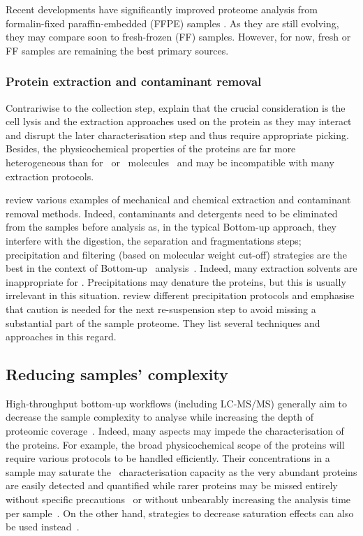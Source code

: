 Recent developments have significantly improved proteome analysis from
formalin-fixed paraffin-embedded (\gls{FFPE}) samples .
As they are still evolving,
they may compare soon to fresh-frozen (\gls{FF}) samples.
However, for now, fresh or \gls{FF} samples are remaining the best primary sources.\mybr\

\subsubsection{Protein extraction and contaminant removal}
Contrariwise to the collection step, \citet{Feist2015} explain that the crucial
consideration is the cell lysis and the extraction approaches used on
the protein as they may interact and disrupt the later characterisation step and
thus require appropriate picking. Besides, the physicochemical properties of
the proteins are far more heterogeneous than for \DNA\ or \RNA\ molecules~
and may be incompatible with many extraction protocols.\mybr\

\citet{Gutstein2008,Bodzon-Kulakowska2007,Visser2005,Hilbrig2003} review various
examples of mechanical and chemical extraction and contaminant removal methods.
Indeed, contaminants and detergents need to be eliminated from the samples
before analysis as, in the typical \gls{Bottom-up} approach, they interfere
with the digestion, the separation and fragmentations steps; precipitation and
filtering (based on molecular weight cut-off) strategies are the best in the
context of \gls{Bottom-up} \ms\ analysis~. Indeed, many
extraction solvents are inappropriate for \ms. Precipitations may denature the
proteins, but this is usually irrelevant in this situation.
\citet{Feist2015} review different precipitation protocols
and emphasise that caution is needed
for the next re-suspension step to avoid missing a substantial part of the
sample proteome. They list several techniques and approaches in this regard.\mybr\

\subsection{Reducing samples' complexity}\label{subsec:simpleProt}

High-throughput bottom-up workflows (including \gls{LC-MS/MS}) generally
aim to decrease the sample complexity to analyse while increasing the depth
of proteomic coverage~. Indeed,
many aspects may impede the characterisation of the proteins.
For example, the broad physicochemical scope of the proteins will
require various protocols to be handled efficiently.
Their concentrations in a sample may saturate the \ms\ characterisation capacity
as the very abundant proteins are easily detected and quantified while rarer
proteins may be missed entirely without specific precautions~ or without unbearably increasing the
analysis time per sample~.
On the other hand, strategies to decrease saturation effects can also be used
instead~.\mybr\

